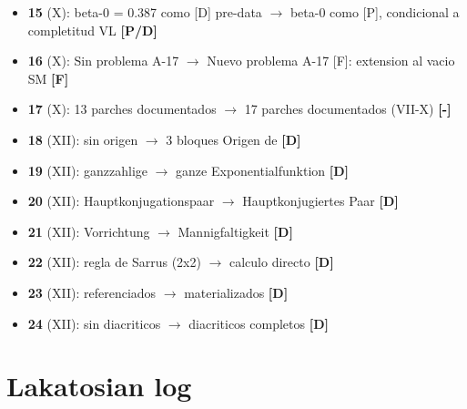 ﻿\documentclass[11pt,letterpaper]{article}
\begin{document}
\begin{itemize}[leftmargin=*]
\item \textbf{15} (X): beta-0 = 0.387 como [D] pre-data $\rightarrow$ beta-0 como [P], condicional a completitud VL \textcolor{Ppurple}{\textbf{[P/D]}}
\item \textbf{16} (X): Sin problema A-17 $\rightarrow$ Nuevo problema A-17 [F]: extension al vacio SM \textcolor{Forange}{\textbf{[F]}}
\item \textbf{17} (X): 13 parches documentados $\rightarrow$ 17 parches documentados (VII-X) \textcolor{black}{\textbf{[-]}}
\item \textbf{18} (XII): sin origen $\rightarrow$ 3 bloques Origen de \textcolor{Dgreen}{\textbf{[D]}}
\item \textbf{19} (XII): ganzzahlige $\rightarrow$ ganze Exponentialfunktion \textcolor{Dgreen}{\textbf{[D]}}
\item \textbf{20} (XII): Hauptkonjugationspaar $\rightarrow$ Hauptkonjugiertes Paar \textcolor{Dgreen}{\textbf{[D]}}
\item \textbf{21} (XII): Vorrichtung $\rightarrow$ Mannigfaltigkeit \textcolor{Dgreen}{\textbf{[D]}}
\item \textbf{22} (XII): regla de Sarrus (2x2) $\rightarrow$ calculo directo \textcolor{Dgreen}{\textbf{[D]}}
\item \textbf{23} (XII): referenciados $\rightarrow$ materializados \textcolor{Dgreen}{\textbf{[D]}}
\item \textbf{24} (XII): sin diacriticos $\rightarrow$ diacriticos completos \textcolor{Dgreen}{\textbf{[D]}}
\end{itemize}

\newpage
\section*{Lakatosian log}
\end{document}
